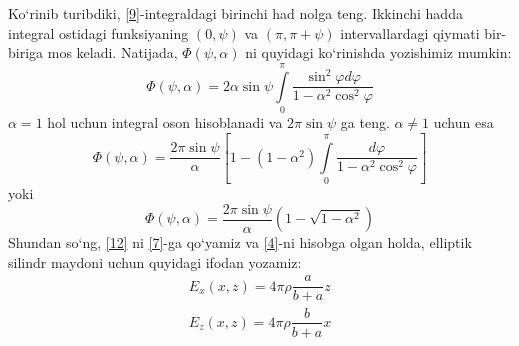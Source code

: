 \documentclass[landscape]{scrartcl}
\begin{document}
	Ko`rinib turibdiki, \eqref{9}-integraldagi birinchi had nolga teng. Ikkinchi hadda integral ostidagi funksiyaning $(0,\psi)$ va $(\pi,\pi+\psi)$
	 intervallardagi qiymati bir-biriga mos keladi. Natijada, $\Phi(\psi,\alpha)$ ni quyidagi ko`rinishda yozishimiz mumkin:
	 \begin{equation}
	 \Phi(\psi,\alpha)=2\alpha\sin\psi\int\limits_{0}^{\pi}\frac{\sin^{2}\varphi d\varphi}{1-\alpha^{2}\cos^{2}\varphi}
	 \label{10}
	 \end{equation}
	$\alpha=1$ hol uchun integral oson hisoblanadi va $2\pi\sin\psi$ ga  teng. $\alpha\ne1$ uchun esa
	\begin{equation}
	\Phi(\psi,\alpha)=\frac{2\pi\sin\psi}{\alpha}
	\left[
	1-(1-\alpha^{2})
	\int\limits_{0}^{\pi}\dfrac{d\varphi}{1-\alpha^{2}\cos^{2}\varphi}
	\right]
	\label{11}
	\end{equation}
	yoki
	\begin{equation}
	\Phi(\psi,\alpha)=\frac{2\pi\sin\psi}{\alpha}
	\left(
	1-\sqrt{1-\alpha^{2}}
	\right)
	\label{12}
	\end{equation}
	Shundan so`ng, \eqref{12} ni \eqref{7}-ga qo`yamiz va \eqref{4}-ni hisobga olgan holda, elliptik silindr maydoni uchun quyidagi ifodan yozamiz:
	\begin{eqnarray}
	E_{x}(x,z)=4\pi\rho\dfrac{a}{b+a}z
	\\
	E_{z}(x,z)=4\pi\rho\dfrac{b}{b+a}x
	\label{13,14}
	\end{eqnarray}
	
	
\end{document}
